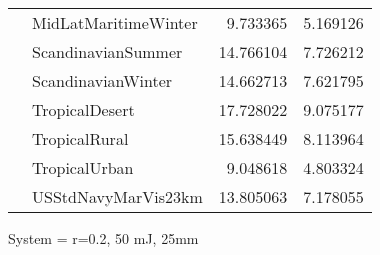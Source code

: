 \begin{tabular}{llrr}
             & MidLatMaritimeWinter &   9.733365 &   5.169126 \\
             & ScandinavianSummer &  14.766104 &   7.726212 \\
             & ScandinavianWinter &  14.662713 &   7.621795 \\
             & TropicalDesert &  17.728022 &   9.075177 \\
             & TropicalRural &  15.638449 &   8.113964 \\
             & TropicalUrban &   9.048618 &   4.803324 \\
             & USStdNavyMarVis23km &  13.805063 &   7.178055 \\
\bottomrule
\end{tabular}


\clearpage
System = r=0.2, 50 mJ, 25mm

